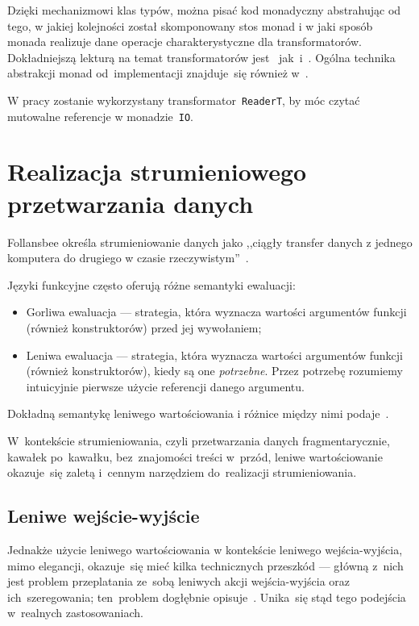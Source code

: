 \documentclass[../../thesis.tex]{subfiles}
\begin{document}
Dzięki mechanizmowi klas typów, można pisać kod monadyczny abstrahując od tego,
w jakiej kolejności został skomponowany stos monad i w jaki sposób monada
realizuje dane operacje charakterystyczne dla transformatorów. 
Dokładniejszą lekturą na temat transformatorów jest~\cite{Grabmuller:MTSS}
jak~i~\cite{Jones:FPO}. Ogólna technika abstrakcji monad od~implementacji
znajduje~się również w~\cite{OSullivan:RWH}.

W pracy zostanie wykorzystany transformator~\texttt{ReaderT}, by móc czytać 
mutowalne referencje w monadzie~\texttt{IO}.

\section{Realizacja strumieniowego przetwarzania danych}

Follansbee określa strumieniowanie danych jako ,,ciągły transfer danych
z jednego komputera do drugiego w czasie rzeczywistym''~\cite{Fallensbee:HGSM}.

Języki funkcyjne często oferują różne semantyki ewaluacji:
\begin{itemize}
  \item Gorliwa ewaluacja --- strategia, która wyznacza wartości argumentów
    funkcji (również konstruktorów) przed jej wywołaniem;
  \item Leniwa ewaluacja --- strategia, która wyznacza wartości argumentów
    funkcji (również konstruktorów), kiedy są one \emph{potrzebne}.
    Przez potrzebę rozumiemy intuicyjnie pierwsze użycie referencji
    danego argumentu.
\end{itemize}
Dokładną semantykę leniwego wartościowania i różnice między nimi podaje~\cite{Hudak:Conception}.

W~kontekście strumieniowania, czyli przetwarzania danych fragmentarycznie,
kawałek po~kawałku, bez~znajomości treści w~przód, leniwe wartościowanie okazuje~się
zaletą i~cennym narzędziem do~realizacji strumieniowania.

\subsection{Leniwe wejście-wyjście}

Jednakże użycie leniwego wartościowania w kontekście leniwego wejścia-wyjścia,
mimo elegancji, okazuje~się mieć kilka technicznych przeszkód --- główną z~nich
jest problem przeplatania ze~sobą leniwych akcji wejścia-wyjścia oraz ich~szeregowania;
ten~problem dogłębnie opisuje~\cite{Thomasson:HHPP}. Unika~się stąd tego podejścia
w~realnych zastosowaniach.
\end{document}
